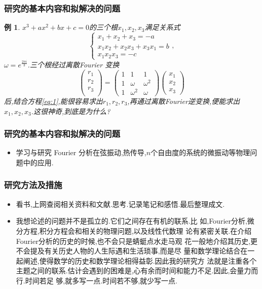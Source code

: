 \documentclass{beamer}
\newtheorem{exam}{例}
\begin{document}
\begin{frame}
  \frametitle{研究的基本内容和拟解决的问题}
      \begin{exam}
$x^3+ax^2+bx+c=0$的三个根$x_1,x_2,x_3$满足关系式
\begin{equation}\label{eq:1}
\begin{cases}
  x_1+x_2+x_3=-a\\
x_1x_2+x_2x_3+x_3x_1=b\\
x_1x_2x_3=-c
\end{cases},
\end{equation}
$\omega=e^{\frac{2\pi i}{3}}$.三个根经过离散Fourier 变换
$$
\begin{pmatrix}
  r_{1}\\
r_{2}\\
r_{3}\\
\end{pmatrix}=
\begin{pmatrix}
  1&1&1\\
1&\omega&\omega^{2}\\
1&\omega^{2}&\omega
\end{pmatrix}
\begin{pmatrix}
  x_1\\
x_2\\
x_3
\end{pmatrix}
$$
后,结合方程\eqref{eq:1},能很容易求出$r_1,r_2,r_3$,再通过离散Fourier逆变换,便能求出
$x_1,x_2,x_3$.这很神奇,到底是为什么?
  \end{exam}
\end{frame}
\begin{frame}
  \frametitle{研究的基本内容和拟解决的问题}
  \begin{itemize}
  \item 学习与研究 Fourier 分析在弦振动,热传导,$n$个自由度的系统的微振动等物理问
    题中的应用.
  \end{itemize}
\end{frame}
\begin{frame}
  \frametitle{研究方法及措施}
\begin{itemize}
\item  看书,上网查阅相关资料和文献.思考.记录笔记和感悟.最后整理成文.\pause
\item 我想论述的问题并不是孤立的.它们之间存在有机的联系.比
  如,Fourier分析,微分方程,积分方程会和相关的物理问题,以及线性代数理
  论有紧密关联.在介绍Fourier分析的历史的时候,也不会只是蜻蜓点水走马观
  花一般地介绍其历史,更不会提及有关历史人物的人生际遇和生活琐事,而是尽
  量和数学理论结合在一起阐述,使得数学的历史和数学理论相得益彰.因此我的研究方
  法就是注重各个主题之间的联系.估计会遇到的困难是,心有余而时间和能力不足.因此,会量力而行.时间若足
  够,就多写一点.时间若不够,就少写一点.
\end{itemize}
\end{frame}
\end{document}
